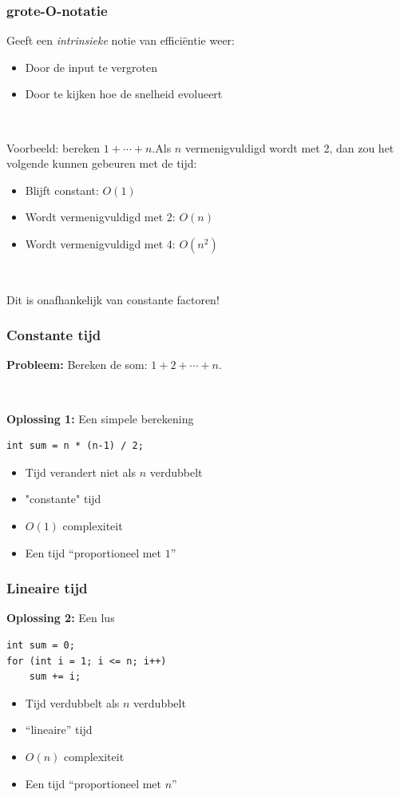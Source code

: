\documentclass[12pt]{beamer}
\begin{document}
\begin{frame}
\frametitle{grote-O-notatie}
Geeft een \emph{intrinsieke} notie van efficiëntie weer:
\begin{itemize}
\item Door de input te vergroten
\item Door te kijken hoe de snelheid evolueert
\end{itemize}

~

Voorbeeld: bereken $1+\cdots+n$.Als $n$ vermenigvuldigd wordt met 2, dan zou het volgende kunnen gebeuren met de tijd:
\begin{itemize}
\item Blijft constant: $O(1)$
\item Wordt vermenigvuldigd met 2: $O(n)$
\item Wordt vermenigvuldigd met 4: $O(n^2)$
\end{itemize}

~

Dit is onafhankelijk van constante factoren!
\end{frame}

\begin{frame}[fragile]
\frametitle{Constante tijd}
\textbf{Probleem:} Bereken de som: $1+2+\cdots+n$.

~

\textbf{Oplossing 1:} Een simpele berekening
\begin{lstlisting}
int sum = n * (n-1) / 2;
\end{lstlisting}
\begin{itemize}
\item Tijd verandert niet als $n$ verdubbelt
\item "constante" tijd
\item  $O(1)$ complexiteit
\item Een tijd ``proportioneel met $1$''
\end{itemize}
\end{frame}

\begin{frame}[fragile]
\frametitle{Lineaire tijd}
\textbf{Oplossing 2:} Een lus
\begin{lstlisting}
int sum = 0;
for (int i = 1; i <= n; i++)
    sum += i;
\end{lstlisting}
\begin{itemize}
\item Tijd verdubbelt als $n$ verdubbelt
\item ``lineaire'' tijd
\item  $O(n)$ complexiteit
\item Een tijd ``proportioneel met $n$''
\end{itemize}
\end{frame}
\end{document}
